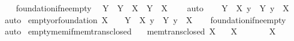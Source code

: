 \begin{isabellebody}
\ \ \isamarkupfalse%
\ foundation{\isacharunderscore}{\kern0pt}if{\isacharunderscore}{\kern0pt}ne{\isacharunderscore}{\kern0pt}empty\ \isamarkupfalse%
\ Y\ \ {\isachardoublequoteopen}Y\ {\isasymin}\ X{\isachardoublequoteclose}\ \ {\isachardoublequoteopen}Y\ {\isasyminter}\ X\ {\isacharequal}{\kern0pt}\ {\isacharbraceleft}{\kern0pt}{\isacharbraceright}{\kern0pt}{\isachardoublequoteclose}\ \isamarkupfalse%
\ auto\isanewline
\ \ \isamarkupfalse%
\ {\isachardoublequoteopen}{\isasymexists}Y\ {\isasymin}\ X{\isachardot}{\kern0pt}\ {\isasymnot}{\isacharparenleft}{\kern0pt}{\isasymexists}y\ {\isasymin}\ Y{\isachardot}{\kern0pt}\ y\ {\isasymin}\ X{\isacharparenright}{\kern0pt}{\isachardoublequoteclose}\ \isamarkupfalse%
\ auto\isanewline
{}\isamarkupfalse%
%
\endisatagproof
{\isafoldproof}%
%
\isadelimproof
\isanewline
%
\endisadelimproof
\isanewline
{}\isamarkupfalse%
\ empty{\isacharunderscore}{\kern0pt}or{\isacharunderscore}{\kern0pt}foundation{\isacharcolon}{\kern0pt}\ {\isachardoublequoteopen}X\ {\isacharequal}{\kern0pt}\ {\isacharbraceleft}{\kern0pt}{\isacharbraceright}{\kern0pt}\ {\isasymor}\ {\isacharparenleft}{\kern0pt}{\isasymexists}Y\ {\isasymin}\ X{\isachardot}{\kern0pt}\ {\isasymforall}y\ {\isasymin}\ Y{\isachardot}{\kern0pt}\ y\ {\isasymnotin}\ X{\isacharparenright}{\kern0pt}{\isachardoublequoteclose}\isanewline
%
\isadelimproof
\ \ %
\endisadelimproof
%
\isatagproof
{}\isamarkupfalse%
\ foundation{\isacharunderscore}{\kern0pt}if{\isacharunderscore}{\kern0pt}ne{\isacharunderscore}{\kern0pt}empty\ \isamarkupfalse%
\ auto%
\endisatagproof
{\isafoldproof}%
%
\isadelimproof
\isanewline
%
\endisadelimproof
\isanewline
{}\isamarkupfalse%
\ empty{\isacharunderscore}{\kern0pt}mem{\isacharunderscore}{\kern0pt}if{\isacharunderscore}{\kern0pt}mem{\isacharunderscore}{\kern0pt}trans{\isacharunderscore}{\kern0pt}closed{\isacharcolon}{\kern0pt}\isanewline
\ \ \ {\isachardoublequoteopen}mem{\isacharunderscore}{\kern0pt}trans{\isacharunderscore}{\kern0pt}closed\ X{\isachardoublequoteclose}\isanewline
\ \ \ {\isachardoublequoteopen}X\ {\isasymnoteq}\ {\isacharbraceleft}{\kern0pt}{\isacharbraceright}{\kern0pt}{\isachardoublequoteclose}\isanewline
\ \ \ {\isachardoublequoteopen}{\isacharbraceleft}{\kern0pt}{\isacharbraceright}{\kern0pt}\ {\isasymin}\ X{\isachardoublequoteclose}\isanewline
%
\isadelimproof
%
\endisadelimproof

\end{isabellebody}
